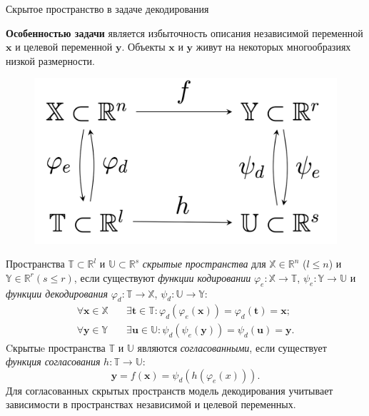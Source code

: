 \documentclass[9pt]{beamer}
\renewcommand{\phi}{\ensuremath{\varphi}}
\renewcommand{\leq}{\ensuremath{\leqslant}}
\newcommand{\bt}{\mathbf{t}}
\newcommand{\bu}{\mathbf{u}}
\newcommand{\bx}{\mathbf{x}}
\newcommand{\by}{\mathbf{y}}
\newcommand{\bbR}{\mathbb{R}}
\newcommand{\bbX}{\mathbb{X}}
\newcommand{\bbY}{\mathbb{Y}}
\newcommand{\bbT}{\mathbb{T}}
\newcommand{\bbU}{\mathbb{U}}
\begin{document}
\begin{frame}{Скрытое пространство в задаче декодирования}
	
	\textbf{Особенностью задачи} является избыточность описания независимой переменной $\bx$ и целевой переменной $\by$.
	Объекты $\bx$ и $\by$ живут на некоторых многообразиях низкой размерности. 
	\begin{figure}
		\includegraphics[width=0.32\linewidth]{figs/decoding_scheme}
	\end{figure}
		
	Пространства $\bbT \subset \bbR^l$ и $\bbU \subset \bbR^s$ \textit{скрытые пространства} для $\bbX \in \bbR^n$ ($l \leq n$) и $\bbY \in \bbR^r (s \leq r)$, если существуют \textit{функции кодировании} $\varphi_e: \bbX \to \bbT$, $\psi_e: \bbY \to \bbU$ и \textit{функции декодирования} $\varphi_d: \bbT  \to \bbX$, $\psi_d: \bbU  \to \bbY$:
	\begin{align*}
	\forall \bx \in \bbX &\quad \exists \bt \in \bbT: \varphi_d (\varphi_e(\bx)) = \varphi_d(\bt) = \bx; \\
	\forall \by \in \bbY &\quad  \exists \bu \in \bbU: \psi_d (\psi_e(\by)) = \psi_d(\bu) = \by.
	\end{align*}
	Cкрытыe пространства $\bbT$ и $\bbU$ являются \textit{согласованными}, если существует \textit{функция согласования} $h: \bbT \rightarrow \bbU$:
	\[
		\by = f(\bx) = \psi_d(h(\phi_e(x))).
	 \]
	Для согласованных скрытых пространств модель декодирования учитывает зависимости в пространствах независимой и целевой переменных.
	
\end{frame}
\end{document}
